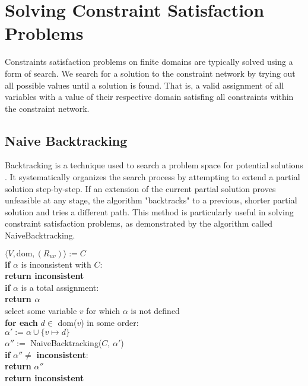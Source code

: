 \chapter{Solving Constraint Satisfaction Problems} \label{chap:solveCSP}

Constraints satisfaction problems on finite domains are typically solved using a form of search. We search for a solution to the constraint network by trying out all possible values until a solution is found. That is, a valid assignment of all variables with a value of their respective domain satisfing all constraints within the constraint network.

\section{Naive Backtracking}

Backtracking is a technique used to search a problem space for potential solutions \cite{backtracking:1975}. It systematically organizes the search process by attempting to extend a partial solution step-by-step. If an extension of the current partial solution proves unfeasible at any stage, the algorithm "backtracks" to a previous, shorter partial solution and tries a different path. This method is particularly useful in solving constraint satisfaction problems, as demonstrated by the algorithm called NaiveBacktracking.

\begin{tcolorbox}[title=function NaiveBacktracking)]
	$\langle V, \text{dom}, (R_{uv})\rangle := C$ \\
	\textbf{if} $\alpha$ is inconsistent with $C$: \\
	\textbf{return inconsistent} \\

	\textbf{if} $\alpha$ is a total assignment: \\
	\textbf{return $\alpha$} \\

	select some variable $v$ for which $\alpha$ is not defined \\
	\textbf{for each} $d \in$ dom($v$) in some order: \\
	$\alpha' := \alpha \cup \{v \mapsto d\}$ \\
	$\alpha'' := $ NaiveBacktracking($C$, $\alpha'$) \\
	\textbf{if} $\alpha'' \neq$ \textbf{inconsistent}: \\
	\textbf{return} $\alpha''$ \\

	\textbf{return inconsistent}
\end{tcolorbox}

